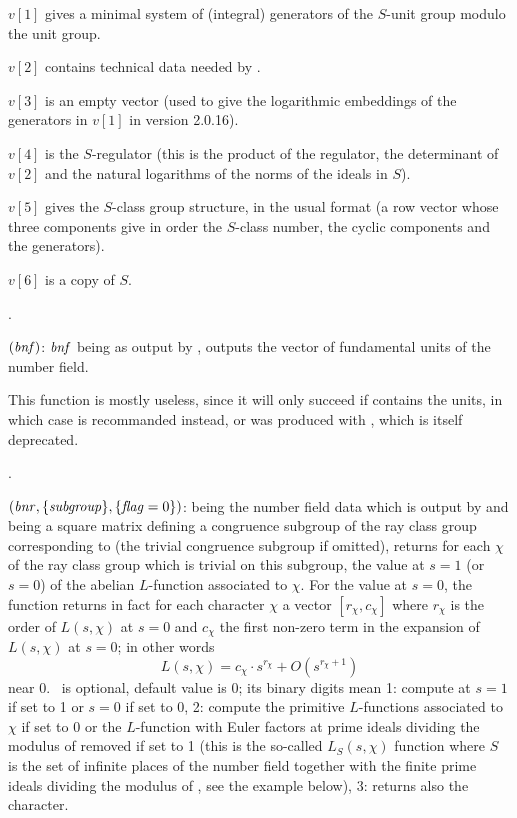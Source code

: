 $v[1]$ gives a minimal system of (integral) generators of the $S$-unit group
modulo the unit group.

$v[2]$ contains technical data needed by .

$v[3]$ is an empty vector (used to give the logarithmic embeddings of the
generators in $v[1]$ in version 2.0.16).

$v[4]$ is the $S$-regulator (this is the product of the regulator, the
determinant of $v[2]$ and the natural logarithms of the norms of the ideals
in $S$).

$v[5]$ gives the $S$-class group structure, in the usual format
(a row vector whose three components give in order the $S$-class number,
the cyclic components and the generators).

$v[6]$ is a copy of $S$.

.

$(\hbox{\it bnf\/})$: $\hbox{\it bnf\/}$ being as output by
, outputs the vector of fundamental units of the number field.

This function is mostly useless, since it will only succeed if
 contains the units, in which case  is recommanded
instead, or  was produced with , which is itself
deprecated.

.

$(\hbox{\it bnr\/},\{\hbox{\it subgroup\/}\},\{\hbox{\it f\kern0pt lag\/}=0\})$:  being
the number field data which is output by  and
 being a square matrix defining a congruence subgroup of the
ray class group corresponding to  (the trivial congruence subgroup
if omitted), returns for each  $\chi$ of the ray class group
which is trivial on this subgroup, the value at $s = 1$ (or $s = 0$) of the
abelian $L$-function associated to $\chi$. For the value at $s = 0$, the
function returns in fact for each character $\chi$ a vector $[r_\chi ,
c_\chi]$ where $r_\chi$ is the order of $L(s, \chi)$ at $s = 0$ and $c_\chi$
the first non-zero term in the expansion of $L(s, \chi)$ at $s = 0$; in other
words
%
$$L(s, \chi) = c_\chi \cdot s^{r_\chi} + O(s^{r_\chi + 1})$$
%
\noindent near $0$. \fl\ is optional, default value is 0; its binary digits
mean 1: compute at $s = 1$ if set to 1 or $s = 0$ if set to 0, 2: compute the
primitive $L$-functions associated to $\chi$ if set to 0 or the $L$-function
with Euler factors at prime ideals dividing the modulus of  removed
if set to 1 (this is the so-called $L_S(s, \chi)$ function where $S$ is the
set of infinite places of the number field together with the finite prime
ideals dividing the modulus of , see the example below), 3: returns
also the character.

